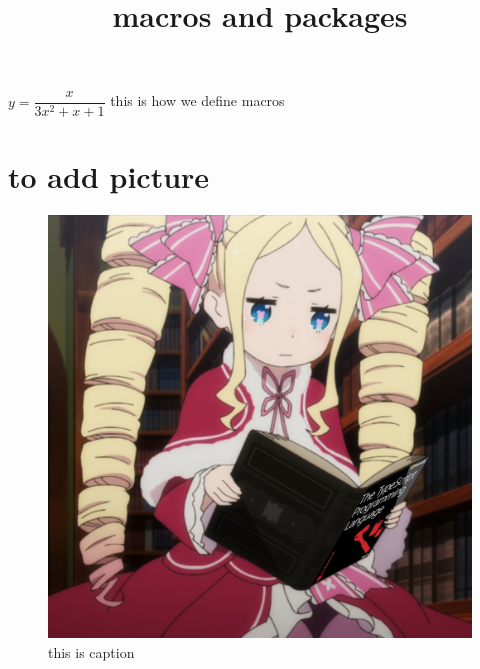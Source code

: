 \documentclass[12pt]{article}
\title{macros and packages}
\def \eq1{y=\dfrac{x}{3x^2+x+1}}
\begin{document}
$\eq1$ this is how we define macros

\section*{to add picture}
\begin{figure}[H]
\includegraphics[scale=0.5]{Beako_Reading_The_TypeScript_Programming_Language}
\caption{this is caption}
\end{figure}
\end{document}
